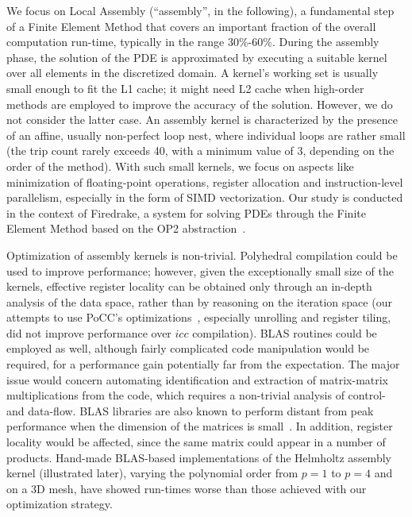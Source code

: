 \documentclass[conference]{IEEEtran}
\begin{document}
We focus on Local Assembly (``assembly'', in the following), a fundamental step of a Finite Element Method that covers an important fraction of the overall computation run-time, typically in the range 30$\%$-60$\%$. During the assembly phase, the solution of the PDE is approximated by executing a suitable kernel over all elements in the discretized domain. A kernel's working set is usually small enough to fit the L1 cache; it might need L2 cache when high-order methods are employed to improve the accuracy of the solution. However, we do not consider the latter case. An assembly kernel is characterized by the presence of an affine, usually non-perfect loop nest, where individual loops are rather small (the trip count rarely exceeds 40, with a minimum value of 3, depending on the order of the method). With such small kernels, we focus on aspects like minimization of floating-point operations, register allocation and instruction-level parallelism, especially in the form of SIMD vectorization. Our study is conducted in the context of Firedrake, a system for solving PDEs through the Finite Element Method based on the OP2 abstraction~\cite{firedrake}.

Optimization of assembly kernels is non-trivial. Polyhedral compilation could be used to improve performance; however, given the exceptionally small size of the kernels, effective register locality can be obtained only through an in-depth analysis of the data space, rather than by reasoning on the iteration space (our attempts to use PoCC's optimizations~\cite{PoCC}, especially unrolling and register tiling, did not improve performance over $icc$ compilation). BLAS routines could be employed as well, although fairly complicated code manipulation would be required, for a performance gain potentially far from the expectation. The major issue would concern automating identification and extraction of matrix-matrix multiplications from the code, which requires a non-trivial analysis of control- and data-flow. BLAS libraries are also known to perform distant from peak performance when the dimension of the matrices is small~\cite{nek5000}. In addition, register locality would be affected, since the same matrix could appear in a number of products. Hand-made BLAS-based implementations of the Helmholtz assembly kernel (illustrated later), varying the polynomial order from $p=1$ to $p=4$ and on a 3D mesh, have showed run-times worse than those achieved with our optimization strategy. 

\end{document}
